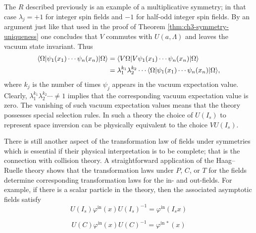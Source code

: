 The $R$ described previously is an example of a multiplicative symmetry; in
that case $\lambda_j=+1$ for integer spin fields and $-1$ for half-odd
integer spin fields.  By an argument just like that used in the proof of
Theorem \ref{thm:ch3-symmetry-uniqueness} one concludes that $V$ commutes with $U(a,\Lambda)$ and leaves
the vacuum state invariant.  Thus
\begin{equation*}
\begin{aligned}
  \langle \Omega\rvert\psi_1(x_1)\cdots\psi_n(x_n)\lvert \Omega\rangle
  &={ }\langle V\Omega\rvert V\psi_1(x_1)\cdots\psi_n(x_n)\lvert \Omega\rangle \\
  &={ }\lambda_1^{k_1}\lambda_2^{k_2}\cdots
  \langle \Omega\rvert\psi_1(x_1)\cdots\psi_n(x_n)\lvert \Omega\rangle,
\end{aligned}
\end{equation*}
where $k_j$ is the number of times $\psi_j$ appears in the vacuum
expectation value.  Clearly, $\lambda_1^{k_1}\lambda_2^{k_2}\cdots\ne1$
implies that the corresponding vacuum expectation value is zero.  The
vanishing of such vacuum expectation values means that the theory possesses
special selection rules.  In such a theory the choice of $U(I_s)$ to
represent space inversion can be physically equivalent to the choice
$VU(I_s)$.

There is still another aspect of the transformation law of fields under
symmetries which is essential if their physical interpretation is to be
complete; that is the connection with collision theory.  A straightforward
application of the Haag--Ruelle theory shows that the transformation laws
under $P$, $C$, or $T$ for the fields determine corresponding transformation
laws for the in- and out-fields.  For example, if there is a scalar particle
in the theory, then the associated asymptotic fields satisfy
\begin{equation*}
  U(I_s)\varphi^{\mathrm{in}}(x)U(I_s)^{-1}
  =\varphi^{\mathrm{in}}(I_sx)
\end{equation*}

\begin{equation*}
  U(C)\varphi^{\mathrm{in}}(x)U(C)^{-1}
  =\varphi^{\mathrm{in}\,*}(x)
\end{equation*}

